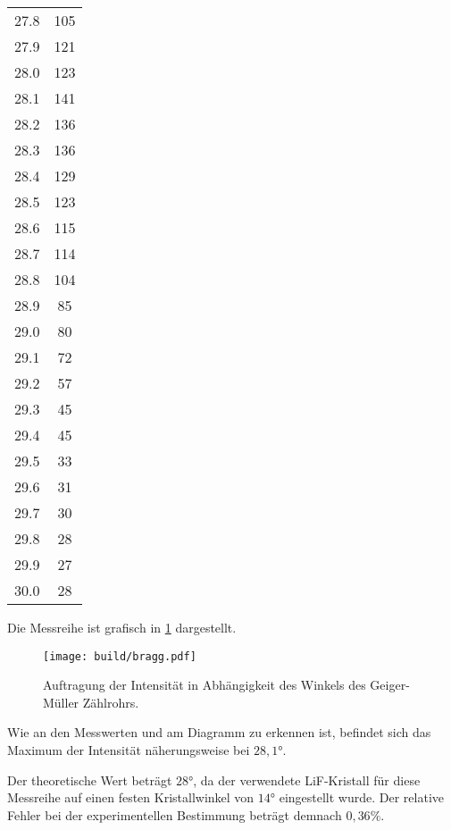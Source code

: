 \begin{table}[htp]
\begin{center}
\begin{tabular}{SS}
                        27.8 & 105\\
                        27.9 & 121\\
                        28.0 & 123\\
                        28.1 & 141\\
                        28.2 & 136\\
                        28.3 & 136\\
                        28.4 & 129\\
                        28.5 & 123\\
                        28.6 & 115\\
                        28.7 & 114\\
                        28.8 & 104\\
                        28.9 & 85\\
                        29.0 & 80\\
                        29.1 & 72\\
                        29.2 & 57\\
                        29.3 & 45\\
                        29.4 & 45\\
                        29.5 & 33\\
                        29.6 & 31\\
                        29.7 & 30\\
                        29.8 & 28\\
                        29.9 & 27\\
                        30.0 & 28\\
                \bottomrule
                \end{tabular}
        \end{center}
\end{table}

Die Messreihe ist grafisch in \ref{fig:bragg} dargestellt.

\begin{figure}
  \centering
  \texttt{[image: build/bragg.pdf]}
  \caption{Auftragung der Intensität in Abhängigkeit des Winkels des Geiger-Müller Zählrohrs.}
  \label{fig:bragg}
\end{figure}

Wie an den Messwerten und am Diagramm zu erkennen ist, befindet sich das Maximum
der Intensität näherungsweise bei $28{,}1°$.

Der theoretische Wert beträgt $28°$, da der verwendete LiF-Kristall für diese Messreihe
auf einen festen Kristallwinkel von $14°$ eingestellt wurde. Der relative Fehler bei
der experimentellen Bestimmung beträgt demnach $0{,}36\%$.

